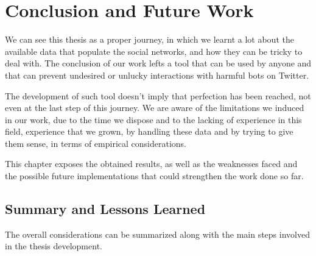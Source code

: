 \chapter{Conclusion and Future Work}
\label{capitolo8}
\thispagestyle{empty}

We can see this thesis as a proper journey, in which we learnt a lot about the available data that populate the social networks, and how they can be tricky to deal with.
The conclusion of our work lefts a tool that can be used by anyone and that can prevent undesired or unlucky interactions with harmful bots on Twitter.

The development of such tool doesn't imply that perfection has been reached, not even at the last step of this journey. We are aware of the limitations we induced in our work, due to the time we dispose and to the lacking of experience in this field, experience that we grown, by handling these data and by trying to give them sense, in terms of empirical considerations. 

This chapter exposes the obtained results, as well as the weaknesses faced and the possible future implementations that could strengthen the work done so far.

\section{Summary and Lessons Learned}
The overall considerations can be summarized along with the main steps involved in the thesis development.

